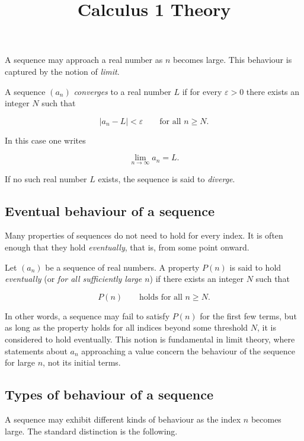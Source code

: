 \documentclass[11pt,a4paper]{article} \usepackage[T1]{fontenc}
\theoremstyle{plain} \newtheorem{theorem}{Theorem} \title{Calculus 1 Theory}
\begin{document}
A sequence may approach a real number as $n$ becomes large. This behaviour is
captured by the notion of \emph{limit}.

\begin{definition}
 A sequence $(a_n)$ \emph{converges} to a real number $L$
if for every $\varepsilon > 0$ there exists an integer $N$ such that

\[
|a_n - L| < \varepsilon \qquad \text{for all } n \ge N.
\]

In this case one writes

\[
\lim_{n\to\infty} a_n = L.
\]

\end{definition}

If no such real number $L$ exists, the sequence is said to \emph{diverge}.

\subsection{Eventual behaviour of a sequence}

Many properties of sequences do not need to hold for every index. It is often
enough that they hold \emph{eventually}, that is, from some point onward.

\begin{definition}
[Eventually] Let $(a_n)$ be a sequence of real numbers. A property $P(n)$ is
said to hold \emph{eventually} (or \emph{for all sufficiently large $n$}) if
there exists an integer $N$ such that

\[
P(n) \qquad \text{holds for all } n \ge N.
\]

\end{definition}

In other words, a sequence may fail to satisfy $P(n)$ for the first few terms,
but as long as the property holds for all indices beyond some threshold $N$, it
is considered to hold eventually. This notion is fundamental in limit theory,
where statements about $a_n$ approaching a value concern the behaviour of the
sequence for large $n$, not its initial terms.

\subsection{Types of behaviour of a sequence}

A sequence may exhibit different kinds of behaviour as the index $n$ becomes
large. The standard distinction is the following.
\end{document}
